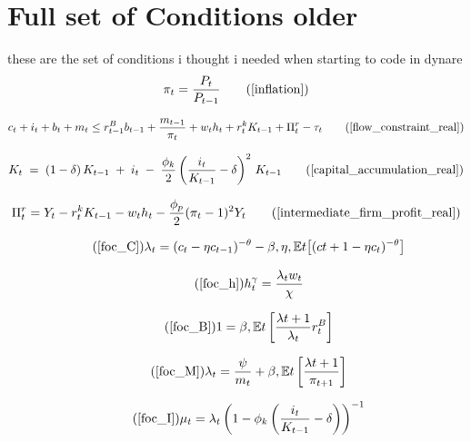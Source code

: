 \documentclass[11pt,preprint]{elsarticle}
\numberwithin{equation}{section}
\numberwithin{figure}{section}
\numberwithin{table}{section}
\begin{document}
\section{Full set of Conditions
older}\label{full-set-of-conditions-older}

these are the set of conditions i thought i needed when starting to code
in dynare \begin{equation}
\pi_t = \frac{P_t}{P_{t-1}}
\tag{\ref{inflation}}
\end{equation}

\begin{equation}
c_t + i_t + b_t + m_t \leq r^B_{t-1}b_{t-1} + \dfrac{m_{t-1}}{\pi_t} + w_t h_t + r^k_t K_{t-1} + \Pi^r_t - \tau_t
\tag{\ref{flow_constraint_real}}
\end{equation}

\begin{equation}
K_t
\;=\;
(1 - \delta)\,K_{t-1}
\;+\; i_t
\;-\;\frac{\phi_k}{2}
\left(\frac{i_t}{K_{t-1}} - \delta\right)^{2}
\,K_{t-1}
\tag{\ref{capital_accumulation_real}}
\end{equation}

\begin{equation}
\Pi^r_t = Y_t - r^k_t K_{t-1} - w_t h_t - \dfrac{\phi_p}{2} (\pi_t - 1)^2 Y_t
\tag{\ref{intermediate_firm_profit_real}}
\end{equation}

\begin{equation}\tag{\ref{foc_C}}
\lambda_t = (c_t-\eta c_{t-1})^{-\theta} - \beta,\eta,\mathbb{E}t\bigl[(c{t+1}-\eta c_t)^{-\theta}\bigr]
\end{equation}

\begin{equation}\tag{\ref{foc_h}}
h_t^{\gamma} = \frac{\lambda_t w_t}{\chi}
\end{equation}

\begin{equation}\tag{\ref{foc_B}}
1 = \beta , \mathbb{E}t \left[ \frac{\lambda{t+1}}{\lambda_t} r^B_t \right]
\end{equation}

\begin{equation}\tag{\ref{foc_M}}
\lambda_t = \dfrac{\psi}{m_t} + \beta , \mathbb{E}t \left[ \dfrac{\lambda{t+1}}{\pi_{t+1}} \right]
\end{equation}

\begin{equation}\tag{\ref{foc_I}}
\mu_t = \lambda_t \left( 1 - \phi_k \left( \frac{i_t}{K_{t-1}} - \delta \right) \right)^{-1}
\end{equation}
\end{document}
